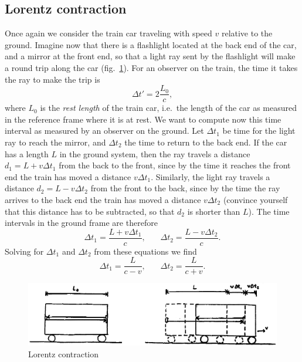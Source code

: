 \documentclass[11pt, a4paper,oneside,openright]{book}
\numberwithin{equation}{section}
\begin{document}
\subsection{Lorentz contraction}

Once again we consider the train car traveling with speed $v$ relative to the ground. Imagine now that there is a flashlight located at the back end of the car, and a mirror at the front end, so that a light ray sent by the flashlight will make a round trip along the car (fig.\ \ref{fig:lec2_3}). For an observer on the train, the time it takes the ray to make the trip is
\begin{equation}
\Delta t'=2\frac{L_0}{c},
\end{equation}
where $L_0$ is the {\it rest length} of the train car, i.e.\ the length of the car as measured in the reference frame where it is at rest. We want to compute now this time interval as measured by an observer on the ground. Let $\Delta t_1$ be time for the light ray to reach the mirror, and $\Delta t_2$ the time to return to the back end. If the car has a length $L$ in the ground system, then the ray travels a distance $d_1=L+v\Delta t_1$ from the back to the front, since by the time it reaches the front end the train has moved a distance $v\Delta t_1$. Similarly, the light ray travels a distance $d_2=L-v\Delta t_2$ from the front to the back, since by the time the ray arrives to the back end the train has moved a distance $v\Delta t_2$ (convince yourself that this distance has to be subtracted, so that $d_2$ is shorter than $L$). The time intervals in the ground frame are therefore
\begin{equation}
\Delta t_1=\frac{L+v\Delta t_1}{c},~~~~~~~~\Delta t_2=\frac{L-v\Delta t_2}{c}.
\end{equation}
Solving for $\Delta t_1$ and $\Delta t_2$ from these equations we find
\begin{equation}
\Delta t_1=\frac{L}{c-v},~~~~~~~~\Delta t_2=\frac{L}{c+v}.
\end{equation}
\begin{figure}[ht]
\begin{center}
\includegraphics[scale=0.6]{Draw/lec2_3.png}
\end{center}
\caption{Lorentz contraction}
\label{fig:lec2_3}
\end{figure}
\end{document}
